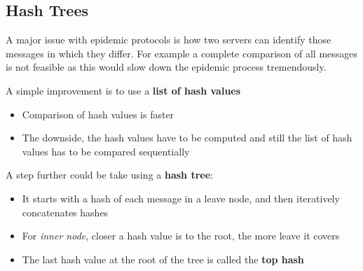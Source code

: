 \subsection{Hash Trees}
A major issue with epidemic protocols is how two servers can identify those messages in which they differ. For example a complete comparison of all messages is not feasible as this would slow down the epidemic process tremendously.

A simple improvement is to use a \textbf{list of hash values}
\begin{itemize}
    \item Comparison of hash values is faster
    \item The downside, the hash values have to be computed and still the list of hash values has to be compared sequentially
\end{itemize}
A step further could be take using a \textbf{hash tree}:
\begin{itemize}
    \item It starts with a hash of each message in a leave node, and then iteratively concatenates hashes
    \item For \textit{inner node}, closer a hash value is to the root, the more leave it covers
    \item The last hash value at the root of the tree is called the \textbf{top hash}
\end{itemize}

